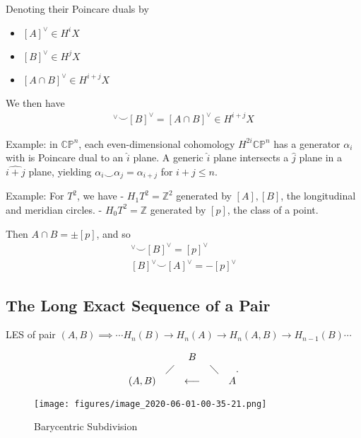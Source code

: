 Denoting their Poincare duals by

\begin{itemize}
\tightlist
\item
  \([A]^\vee\in H^i X\)
\item
  \([B]^\vee\in H^j X\)
\item
  \([A\cap B]^\vee\in H^{i+j}X\)
\end{itemize}

We then have
\begin{align*}
[A]^\vee\smile [B]^\vee= [A\cap B]^\vee\in H^{i+j} X
\end{align*}

Example: in \({\mathbb{CP}}^n\), each even-dimensional cohomology
\(H^{2i}{\mathbb{CP}}^n\) has a generator \(\alpha_i\) with is Poincare
dual to an \(\widehat{i}\) plane. A generic \(\widehat{i}\) plane
intersects a \(\widehat{j}\) plane in a \(\widehat{i+j}\) plane,
yielding \(\alpha_i \smile \alpha_j = \alpha_{i+j}\) for \(i+j \leq n\).

Example: For \(T^2\), we have - \(H_1T^2 = {\mathbb{Z}}^2\) generated by
\([A], [B]\), the longitudinal and meridian circles. -
\(H_0T^2 = {\mathbb{Z}}\) generated by \([p]\), the class of a point.

Then \(A\cap B = \pm [p]\), and so
\begin{align*}
[A]^\vee\smile [B]^\vee= [p]^\vee\\
[B]^\vee\smile [A]^\vee= -[p]^\vee
\end{align*}

\hypertarget{the-long-exact-sequence-of-a-pair}{%
\subsection{The Long Exact Sequence of a
Pair}\label{the-long-exact-sequence-of-a-pair}}

LES of pair
\((A,B) \implies \cdots H_n(B) \to H_n(A) \to H_n(A,B) \to H_{n-1}(B) \cdots\)

\begin{align*} \begin{matrix}   && B & \\ &\diagup &  & \diagdown \\ (A,B) & & \longleftarrow &  & A \end{matrix} .\end{align*}

\begin{figure}
\centering
\texttt{[image: figures/image\_2020-06-01-00-35-21.png]}
\caption{Barycentric Subdivision}
\end{figure}


